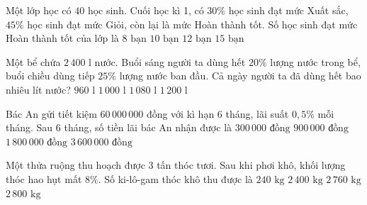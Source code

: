 \begin{ex} %
Một lớp học có $40$ học sinh. Cuối học kì 1, có $30\%$ học sinh đạt mức Xuất sắc, $45\%$ học sinh đạt mức Giỏi, còn lại là mức Hoàn thành tốt. Số học sinh đạt mức Hoàn thành tốt của lớp là
\choice
{$8\text{ bạn}$}
{\True $10\text{ bạn}$}
{$12\text{ bạn}$}
{$15\text{ bạn}$}
\end{ex}

\begin{ex} %
Một bể chứa $2\,400\text{ l}$ nước. Buổi sáng người ta dùng hết $20\%$ lượng nước trong bể, buổi chiều dùng tiếp $25\%$ lượng nước ban đầu. Cả ngày người ta đã dùng hết bao nhiêu lít nước?
\choice
{$960\text{ l}$}
{$1\,000\text{ l}$}
{\True $1\,080\text{ l}$}
{$1\,200\text{ l}$}
\end{ex}

\begin{ex} %
Bác An gửi tiết kiệm $60\,000\,000$ đồng với kì hạn $6$ tháng, lãi suất $0{,}5\%$ mỗi tháng. Sau $6$ tháng, số tiền lãi bác An nhận được là
\choice
{$300\,000\text{ đồng}$}
{$900\,000\text{ đồng}$}
{\True $1\,800\,000\text{ đồng}$}
{$3\,600\,000\text{ đồng}$}
\end{ex}

\begin{ex} %
Một thửa ruộng thu hoạch được $3$ tấn thóc tươi. Sau khi phơi khô, khối lượng thóc hao hụt mất $8\%$. Số ki-lô-gam thóc khô thu được là
\choice
{$240\text{ kg}$}
{$2\,400\text{ kg}$}
{\True $2\,760\text{ kg}$}
{$2\,800\text{ kg}$}
\end{ex}

